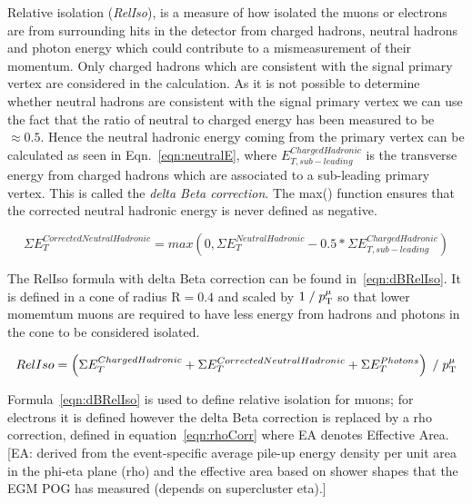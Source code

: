Relative isolation (\emph{RelIso}), is a measure of how isolated the muons or electrons are from surrounding hits in the detector from charged hadrons, neutral hadrons and photon energy which could contribute to a mismeasurement of their momentum. Only charged hadrons which are consistent with the signal primary vertex are considered in the calculation. As it is not possible to determine whether neutral hadrons are consistent with the signal primary vertex we can use the fact that the ratio of neutral to charged energy has been measured to be $\approx 0.5$. Hence the neutral hadronic energy coming from the primary vertex can be calculated as seen in Eqn.~\ref{eqn:neutralE}, where $E_{T,sub-leading}^{Charged Hadronic}$ is the transverse energy from charged hadrons which are associated to a sub-leading primary vertex. This is called the \emph{delta Beta correction}. The max() function ensures that the corrected neutral hadronic energy is never defined as negative.


\begin{centering}
\begin{equation}
\Sigma E_{T}^{Corrected Neutral Hadronic}  =  max(0, \Sigma E_{T}^{Neutral Hadronic} - 0.5*\Sigma E_{T,sub-leading}^{Charged Hadronic} )
\label{eqn:neutralE}
\end{equation}
\end{centering}



The RelIso formula with delta Beta correction can be found in~\ref{eqn:dBRelIso}. It is defined in a cone of radius $\textrm{R}=0.4$ and scaled by $1\; / \;p_{\mathrm{T}}^{\mu}$ so that lower momemtum muons are required to have less energy from hadrons and photons in the cone to be considered isolated.

\begin{centering}
\begin{equation}
RelIso = \left( \Sigma E_{T}^{Charged Hadronic} + \Sigma E_{T}^{Corrected Neutral Hadronic} +  \Sigma E_{T}^{Photons} \right) \; / \;   p_{\mathrm{T}}^{\mu}
\label{eqn:dBRelIso}
\end{equation}
\end{centering}


Formula~\ref{eqn:dBRelIso} is used to define relative isolation for muons; for electrons it is defined however the delta Beta correction is replaced by a rho correction, defined in equation~\ref{eqn:rhoCorr} where EA denotes Effective Area. [EA: derived from the event-specific average pile-up energy density per unit area in the phi-eta plane (rho) and the effective area based on shower shapes that the EGM POG has measured (depends on supercluster eta).] 

